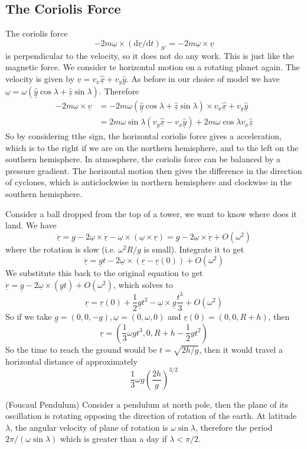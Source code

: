 \subsection{The Coriolis Force}
The coriolis force
$$-2m\underline{\omega}\times(\mathrm d\underline{r}/\mathrm dt)_{S'}=-2m\underline{\omega}\times\underline{v}$$
is perpendicular to the velocity, so it does not do any work.
This is just like the magnetic force.
We consider te horizontal motion on a rotating planet again.
The velocity is given by $\underline{v}=v_x\underline{\hat{x}}+v_y\underline{\hat{y}}$.
As before in our choice of model we have $\underline{\omega}=\omega(\underline{\hat{y}}\cos\lambda+\underline{\hat{z}}\sin\lambda)$.
Therefore
\begin{align*}
    -2m\underline{\omega}\times\underline{v}&=-2m\omega(\underline{\hat{y}}\cos\lambda+\underline{\hat{z}}\sin\lambda)\times v_x\underline{\hat{x}}+v_y\underline{\hat{y}}\\
    &=2m\omega\sin\lambda(v_y\underline{\hat{x}}-v_x\underline{\hat{y}})+2m\omega\cos\lambda v_x\underline{\hat{z}}
\end{align*}
So by considering tthe sign, the horizontal coriolis force gives a acceleration, which is to the right if we are on the northern hemisphere, and to the left on the southern hemisphere.
In atmosphere, the coriolis force can be balanced by a pressure gradient.
The horizontal motion then gives the difference in the direction of cyclones, which is anticlockwise in northern hemisphere and clockwise in the southern hemisphere.
\begin{example}
    Consider a ball dropped from the top of a tower, we want to know where does it land.
    We have
    $$\underline{\ddot{r}}=\underline{g}-2\underline{\omega}\times\underline{\dot{r}}-\underline{\omega}\times(\underline{\omega}\times\underline{r})=\underline{g}-2\underline{\omega}\times\underline{\dot{r}}+O(\omega^2)$$
    where the rotation is slow (i.e. $\omega^2R/g$ is small).
    Integrate it to get
    $$\underline{\dot{r}}=\underline{g}t-2\underline{\omega}\times (\underline{r}-\underline{r}(0))+O(\omega^2)$$
    We substitute this back to the original equation to get $\underline{\ddot{r}}=\underline{g}-2\underline{\omega}\times(\underline{g}t)+O(\omega^2)$, which solves to
    $$\underline{r}=\underline{r}(0)+\frac{1}{2}\underline{g}t^2-\underline{\omega}\times\underline{g}\frac{t^3}{3}+O(\omega^2)$$
    So if we take $\underline{g}=(0,0,-g),\underline{\omega}=(0,\omega,0)$ and $\underline{r}(0)=(0,0,R+h)$, then
    $$\underline{r}=\left(\frac{1}{3}\omega gt^3,0,R+h-\frac{1}{2}gt^2\right)$$
    So the time to reach the ground would be $t=\sqrt{2h/g}$, then it would travel a horizontal distance of approximately
    $$\frac{1}{3}\omega g\left(\frac{2h}{g}\right)^{3/2}$$
\end{example}
(Foucaul Pendulum)
Consider a pendulum at north pole, then the plane of its oscillation is rotating opposing the direction of rotation of the earth.
At latitude $\lambda$, the angular velocity of plane of rotation is $\omega\sin\lambda$, therefore the period $2\pi/(\omega\sin\lambda)$ which is greater than a day if $\lambda<\pi/2$.